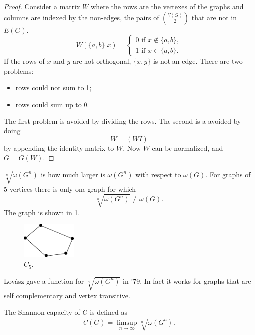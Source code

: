 \begin{proof}
	Consider a matrix $W$ where the rows are the vertexes of the graphs and columns are indexed by the non-edges, \ie the pairs of $\binom{V(G)}{2}$ that are not in $E(G)$.
	\begin{equation}
		W \left( \{a,b\} | x \right) =
			\begin{cases}
				0 \text{ if } x \not\in \{a, b\}, \\
				1 \text{ if } x \in \{a, b\}.
			\end{cases}
	\end{equation}
	If the rows of $x$ and $y$ are not orthogonal, $\{x, y\}$ is not an edge.
	There are two problems:
	\begin{itemize}
		\item rows could not sum to 1;
		\item rows could sum up to 0.
	\end{itemize}
	The first problem is avoided by dividing the rows.
	The second is a avoided by doing
	\begin{equation*}
		W = (W I)
	\end{equation*}
	\ie by appending the identity matrix to $W$.
	Now $W$ can be normalized, and $G = G(W)$.
\end{proof}

$\sqrt[n]{\omega(G^n)}$ is how much larger is $\omega(G^n)$ with respect to $\omega(G)$.
For graphs of $5$ vertices there is only one graph for which
\begin{equation*}
	\sqrt[n]{\omega(G^n)} \neq \omega(G).
\end{equation*}
The graph is shown in \cref{fig:5-graph}.

\begin{figure}
	\centering
	\includegraphics[width=100px]{pictures/graph5v.eps}
	\caption{$C_5$. \label{fig:5-graph}}
\end{figure}

Lov\`asz gave a function for $ \sqrt[n]{\omega(G^n)}$ in '79.
In fact it works for graphs that are self complementary and vertex transitive.

The Shannon capacity of $G$ is defined as
\begin{equation*}
	C(G) = \limsup_{n \to \infty} \sqrt[n]{\omega(G^n)}.
\end{equation*}

